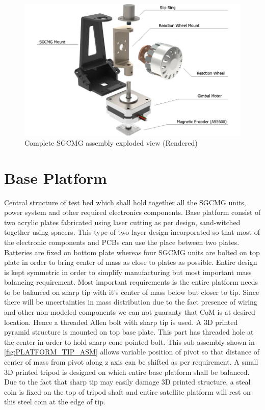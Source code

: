 \begin{figure}[ht]
    \centering
    \includegraphics[width=\textwidth]{figures/Assembly/sgcmg_asm.pdf}
    \caption{Complete SGCMG assembly exploded view (Rendered)}
    \label{fig:SGCMG_ASM_exp}
\end{figure}

\section{Base Platform}
Central structure of test bed which shall hold together all the SGCMG units, power system and other required electronics components. Base platform consist of two acrylic plates fabricated using laser cutting as per design, sand-witched together using spacers. This type of two layer design incorporated so that most of the electronic components and PCBs can use the place between two plates. Batteries are fixed on bottom plate whereas four SGCMG units are bolted on top plate in order to bring center of mass as close to plates as possible. Entire design is kept symmetric in order to simplify manufacturing but most important mass balancing requirement. Most important requirements is the entire platform needs to be balanced on sharp tip with it's center of mass below but closer to tip. Since there will be uncertainties in mass distribution due to the fact presence of wiring and other non modeled components we can not guaranty that CoM is at desired location. Hence a threaded Allen bolt with sharp tip is used. A 3D printed pyramid structure is mounted on top base plate. This part has threaded hole at the center in order to hold sharp cone pointed bolt. This sub assembly shown in \autoref{fig:PLATFORM_TIP_ASM} allows variable position of pivot so that distance of center of mass from pivot along z axis can be shifted as per requirement. A small 3D printed tripod is designed on which entire base platform shall be balanced. Due to the fact that sharp tip may easily damage 3D printed structure, a steal coin is fixed on the top of tripod shaft and entire satellite platform will rest on this steel coin at the edge of tip.

